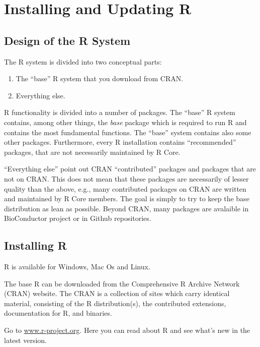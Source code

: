 \documentclass[]{book}
\providecommand{\tightlist}{%
  \setlength{\itemsep}{0pt}\setlength{\parskip}{0pt}}
\def\tightlist{}
\begin{document}
\section{Installing and Updating R}\label{installing-and-updating-r}

\subsection{Design of the R System}\label{design-of-the-r-system}

The R system is divided into two conceptual parts:

\begin{enumerate}
\def\labelenumi{\arabic{enumi}.}
\tightlist
\item
  The ``base'' R system that you download from CRAN.
\item
  Everything else.
\end{enumerate}

R functionality is divided into a number of packages. The ``base'' R
system contains, among other things, the \emph{base} package which is
required to run R and contains the most fundamental functions. The
``base'' system contains also some other packages. Furthermore, every R
installation contains ``recommended'' packages, that are not necessarily
maintained by R Core.

``Everything else'' point out CRAN ``contributed'' packages and packages
that are not on CRAN. This does not mean that these packages are
necessarily of lesser quality than the above, e.g., many contributed
packages on CRAN are written and maintained by R Core members. The goal
is simply to try to keep the base distribution as lean as possible.
Beyond CRAN, many packages are avalaible in BioConductor project or in
Github repositories.

\clearpage

\subsection{Installing R}\label{installing-r}

R is available for Windows, Mac Os and Linux.

The base R can be downloaded from the Comprehensive R Archive Network
(CRAN) website. The CRAN is a collection of sites which carry identical
material, consisting of the R distribution(s), the contributed
extensions, documentation for R, and binaries.

Go to \href{http://www.r-project.org/}{www.r-project.org}. Here you can
read about R and see what's new in the latest version.
\end{document}

